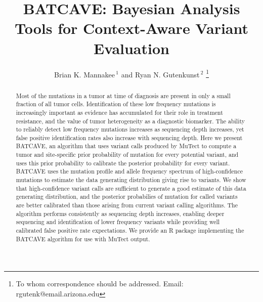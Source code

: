 \documentclass[a4,center,fleqn]{NAR}
\newcommand{\batcave}{BATCAVE\xspace}
\begin{document}
\title{\batcave: Bayesian Analysis Tools for Context-Aware Variant Evaluation}

\author{%
Brian K. Mannakee\,$^{1}$ and
Ryan N. Gutenkunst\,$^{2}$%
\footnote{To whom correspondence should be addressed.
Email: rgutenk@email.arizona.edu}}

\address{%
$^{1}$Mel and Enid Zuckerman College of Public Health, University of Arizona, Tucson AZ
and
$^{2}$Department of Molecular and Cellular Biology, University of Arizona, Tucson AZ}


\maketitle

\begin{abstract}
Most of the mutations in a tumor at time of diagnosis are present in only a small fraction of all tumor cells.
Identification of these low frequency mutations is increasingly important as evidence has accumulated for their role in treatment resistance, and the value of tumor heterogeneity as a diagnostic biomarker.
The ability to reliably detect low frequency mutations increases as sequencing depth increases, yet false positive identification rates also increase with sequencing depth.
Here we present \batcave, an algorithm that uses variant calls produced by MuTect to compute a tumor and site-specific prior probability of mutation for every potential variant, and uses this prior probability to calibrate the posterior probability for every variant.
\batcave uses the mutation profile and allele frequency spectrum of high-confidence mutations to estimate the data generating distribution giving rise to variants.
We show that high-confidence variant calls are sufficient to generate a good estimate of this data generating distribution, and the posterior probabilies of mutation for called variants are better calibrated than those arising from current variant calling algorithms.
The algorithm performs consistently as sequencing depth increases, enabling deeper sequencing and identification of lower frequency variants while providing well calibrated false positive rate expectations.
We provide an R package implementing the \batcave algorithm for use with MuTect output.
\end{abstract}
\end{document}
